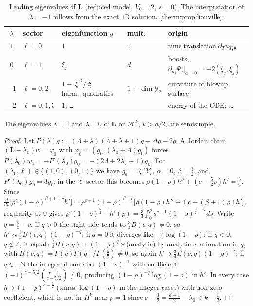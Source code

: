 \begin{table}[t]
\centering
\begin{tabular}{@{}cllll@{}}
\toprule
$\lambda$ & sector & eigenfunction $g$ & mult. & origin \\
\midrule
$1$ & $\ell=0$ & $1$ & $1$ & time translation $\partial_T u_{T,0}$\\
$0$ & $\ell=1$ & $\xi_j$ & $d$ & boosts, $\partial_{a_j}\Psi_a|_{a=0}=-2(\xi_j,\xi_j)$\\
$-1$ & $\ell=0,2$ & $1-|\xi|^2/d$; harm.\ quadratics & $1+\dim\mathcal Y_2$ & curvature of blowup surface\\
$-2$ & $\ell=0,1,3$ & $1$; \dots & & energy of the ODE; \dots\\
\bottomrule
\end{tabular}
\caption{Leading eigenvalues of $\mathbf L$ (reduced model, $V_0=2$, $s=0$).  The
interpretation of $\lambda=-1$ follows from the exact $1$D solution, \cref{therm:prop:liouville}.}
\label{therm:tab:eigs}
\end{table}

\begin{lemma}[Semisimplicity]\label{therm:lem:semisimple}
The eigenvalues $\lambda=1$ and $\lambda=0$ of $\mathbf L$ on $\mathcal H^k$, $k>d/2$, are semisimple.
\end{lemma}

\begin{proof}
Let $P(\lambda)g:=(\Lambda+\lambda)(\Lambda+\lambda+1)g-\Delta g-2g$.  A Jordan chain $(\mathbf L-\lambda_0)w=\varphi_0$
with $\varphi_0=(g_0,(\lambda_0+\Lambda)g_0)$ forces $P(\lambda_0)w_1=-P'(\lambda_0)g_0=-(2\Lambda+2\lambda_0+1)g_0$.
For $(\lambda_0,\ell)\in\{(1,0),(0,1)\}$ we have $g_0=|\xi|^\ell Y_\ell$, $\alpha=0$,
$\beta=\frac32$, and $P'(\lambda_0)g_0=3g_0$; in the $\ell$-sector this becomes
$\rho(1-\rho)h''+(c-\frac52\rho)h'=\frac34$.  Since
$\frac{d}{d\rho}\bigl[\rho^c(1-\rho)^{\beta+1-c}h'\bigr]=\rho^{c-1}(1-\rho)^{\beta-c}\bigl[\rho(1-\rho)h''+(c-(\beta+1)\rho)h'\bigr]$,
regularity at $0$ gives
$\rho^c(1-\rho)^{\frac52-c}h'(\rho)=\frac34\int_0^\rho s^{c-1}(1-s)^{\frac32-c}\,ds$.
Write $q=\frac52-c$.  If $q>0$ the right side tends to $\frac34B(c,q)\ne0$, so
$h'\sim\frac34B(c,q)(1-\rho)^{-q}$; if $q=0$ it diverges like $-\frac34\log(1-\rho)$;
if $q<0$, $q\notin\mathbb{Z}$, it equals $\frac34B(c,q)+(1-\rho)^q\times$(analytic) by
analytic continuation in $q$, with $B(c,q)=\Gamma(c)\Gamma(q)/\Gamma(\frac52)\neq0$, so again
$h'\ni\frac34B(c,q)(1-\rho)^{-q}$; if $q\in-\mathbb{N}$ the integrand contains
$(1-s)^{-1}$ with coefficient $(-1)^{c-5/2}\binom{c-1}{c-5/2}\neq0$, producing
$(1-\rho)^{-q}\log(1-\rho)$ in $h'$.  In every case $h\ni(1-\rho)^{c-\frac32}$ (times
$\log(1-\rho)$ in the integer cases) with non-zero coefficient, which is not in
$H^k$ near $\rho=1$ since $c-\frac32=\frac{d-1}{2}-\lambda_0<k-\frac12$.
\end{proof}

